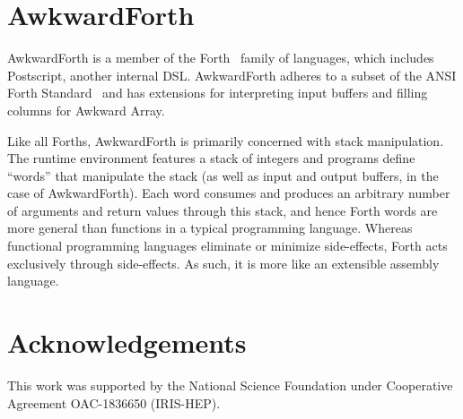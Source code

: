 \documentclass{webofc}
\begin{document}
\section{AwkwardForth}

AwkwardForth is a member of the Forth~\cite{forth} family of languages, which includes Postscript, another internal DSL. AwkwardForth adheres to a subset of the ANSI Forth Standard~\cite{forth-standard} and has extensions for interpreting input buffers and filling columns for Awkward Array.

Like all Forths, AwkwardForth is primarily concerned with stack manipulation. The runtime environment features a stack of integers and programs define ``words'' that manipulate the stack (as well as input and output buffers, in the case of AwkwardForth). Each word consumes and produces an arbitrary number of arguments and return values through this stack, and hence Forth words are more general than functions in a typical programming language. Whereas functional programming languages eliminate or minimize side-effects, Forth acts exclusively through side-effects. As such, it is more like an extensible assembly language.







\section{Acknowledgements}

This work was supported by the National Science Foundation under Cooperative Agreement OAC-1836650 (IRIS-HEP).






\end{document}
